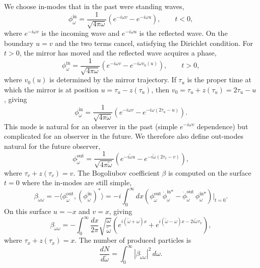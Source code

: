 We choose in-modes that in the past were standing waves,
\begin{equation}
	\phi^{\text{in}}_\omega
	= \frac{1}{\sqrt{4\pi\omega}}
	\left(e^{-i\omega v} - e^{-i\omega u}\right),
	\qquad t < 0,
\end{equation}
where $e^{-i\omega v}$ is the incoming wave and $e^{-i\omega u}$ is
the reflected wave. On the boundary $u = v$ and the two terms cancel,
satisfying the Dirichlet condition. For $t > 0$, the mirror has moved
and the reflected wave acquires a phase,
\begin{equation}
	\phi^{\text{in}}_\omega
	= \frac{1}{\sqrt{4\pi\omega}}
	\left(e^{-i\omega v} - e^{-i\omega v_0(u)}\right),
	\qquad t > 0,
\end{equation}
where $v_0(u)$ is determined by the mirror trajectory. If $\tau_u$ is
the proper time at which the mirror is at position $u = \tau_u -
	z(\tau_u)$, then $v_0 = \tau_u + z(\tau_u) = 2\tau_u - u$, giving
\begin{equation}
	\phi^{\text{in}}_\omega
	= \frac{1}{\sqrt{4\pi\omega}}
	\left(e^{-i\omega v} - e^{-i\omega(2\tau_u - u)}\right).
\end{equation}
This mode is natural for an observer in the past (simple $e^{-i\omega v}$
dependence) but complicated for an observer in the future. We therefore
also define out-modes natural for the future observer,
\begin{equation}
	\phi^{\text{out}}_{\tilde\omega}
	= \frac{1}{\sqrt{4\pi\tilde\omega}}
	\left(e^{-i\tilde\omega u}
	- e^{-i\tilde\omega(2\tau_v - v)}\right),
\end{equation}
where $\tau_v + z(\tau_v) = v$. The Bogoliubov coefficient $\beta$ is
computed on the surface $t = 0$ where the in-modes are still simple,
\begin{equation}
	\beta_{\tilde\omega\omega}
	= -\langle\phi^{\text{out}}_{\tilde\omega},
	(\phi^{\text{in}}_\omega)^*\rangle
	= -i\int_0^\infty dx\left(
	\phi^{\text{out}}_{\tilde\omega}\,
	\dot\phi^{\text{in}*}_\omega
	- \dot\phi^{\text{out}}_{\tilde\omega}\,
	\phi^{\text{in}*}_\omega\right)\bigg|_{t=0}.
\end{equation}
On this surface $u = -x$ and $v = x$, giving
\begin{equation}
	\beta_{\tilde\omega\omega}
	= -\int_0^\infty\frac{dx}{2\pi}
	\sqrt{\frac{\omega}{\tilde\omega}}
	\left(e^{i(\tilde\omega+\omega)x}
	+ e^{i(\tilde\omega-\omega)x - 2i\tilde\omega\tau_x}\right),
	\label{eq:beta-mirror}
\end{equation}
where $\tau_x + z(\tau_x) = x$. The number of produced particles is
\begin{equation}
	\frac{dN}{d\tilde\omega}
	= \int_0^\infty|\beta_{\tilde\omega\omega}|^2\,d\omega.
\end{equation}

